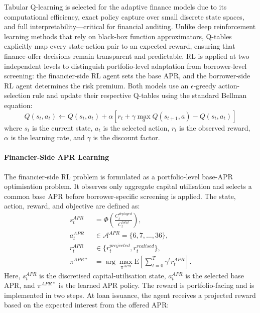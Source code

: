 \documentclass[12pt]{article}
\begin{document}
	Tabular Q-learning is selected for the adaptive finance models due to its computational efficiency, exact policy capture over small discrete state spaces, and full interpretability—critical for financial auditing. Unlike deep reinforcement learning methods that rely on black-box function approximators, Q-tables explicitly map every state-action pair to an expected reward, ensuring that finance-offer decisions remain transparent and predictable. RL is applied at two independent levels to distinguish portfolio-level adaptation from borrower-level screening: the financier-side RL agent sets the base APR, and the borrower-side RL agent determines the risk premium. Both models use an \(\epsilon\)-greedy action-selection rule and update their respective Q-tables using the standard Bellman equation:
	\[
	Q(s_t, a_t) \leftarrow Q(s_t, a_t) + \alpha \left[ r_t + \gamma \max_{a} Q(s_{t+1}, a) - Q(s_t, a_t) \right]
	\]
	where \(s_t\) is the current state, \(a_t\) is the selected action, \(r_t\) is the observed reward, \(\alpha\) is the learning rate, and \(\gamma\) is the discount factor.
	
	\paragraph{Financier-Side APR Learning}
	The financier-side RL problem is formulated as a portfolio-level base-APR optimisation problem. It observes only aggregate capital utilisation and selects a common base APR before borrower-specific screening is applied. The state, action, reward, and objective are defined as:
	\[
	\begin{aligned}
	s_t^{APR} &= \Phi\left(\frac{C^{deployed}_t}{C^{total}_t}\right),\\
	a_t^{APR} &\in \mathcal{A}^{APR}=\{6,7,\ldots,36\},\\
	r_t^{APR} &\in \{r_t^{projected},r_t^{realised}\},\\
	\pi^{APR*} &= \arg\max_{\pi^{APR}}\mathrm{E}\left[\sum_{t=0}^{T}\gamma^{t}r_t^{APR}\right].
	\end{aligned}
	\]
	Here, \(s_t^{APR}\) is the discretised capital-utilisation state, \(a_t^{APR}\) is the selected base APR, and \(\pi^{APR*}\) is the learned APR policy. The reward is portfolio-facing and is implemented in two steps. At loan issuance, the agent receives a projected reward based on the expected interest from the offered APR:
	
\end{document}
